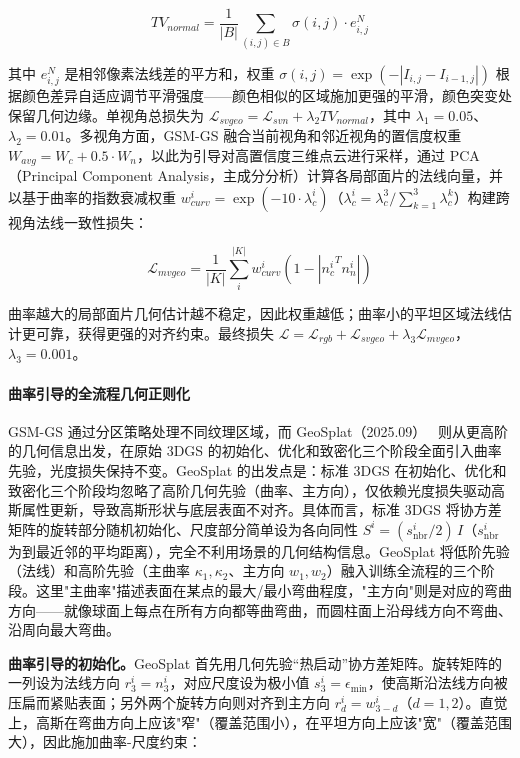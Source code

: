 \begin{equation}
TV_{normal} = \frac{1}{|B|} \sum_{(i,j) \in B} \sigma(i,j) \cdot e^N_{i,j}
\end{equation}

其中 $e^N_{i,j}$ 是相邻像素法线差的平方和，权重 $\sigma(i,j) = \exp(-|I_{i,j} - I_{i-1,j}|)$ 根据颜色差异自适应调节平滑强度——颜色相似的区域施加更强的平滑，颜色突变处保留几何边缘。单视角总损失为 $\mathcal{L}_{svgeo} = \mathcal{L}_{svn} + \lambda_2 TV_{normal}$，其中 $\lambda_1 = 0.05$、$\lambda_2 = 0.01$。多视角方面，GSM-GS 融合当前视角和邻近视角的置信度权重 $W_{avg} = W_c + 0.5 \cdot W_n$，以此为引导对高置信度三维点云进行采样，通过 PCA（Principal Component Analysis，主成分分析）计算各局部面片的法线向量，并以基于曲率的指数衰减权重 $w^i_{curv} = \exp(-10 \cdot \lambda^i_c)$（$\lambda^i_c = \lambda^3_c / \sum_{k=1}^3 \lambda^k_c$）构建跨视角法线一致性损失：

\begin{equation}
\mathcal{L}_{mvgeo} = \frac{1}{|K|} \sum_{i}^{|K|} w^i_{curv} (1 - |{n_c^{i}}^T n_n^i|)
\end{equation}

曲率越大的局部面片几何估计越不稳定，因此权重越低；曲率小的平坦区域法线估计更可靠，获得更强的对齐约束。最终损失 $\mathcal{L} = \mathcal{L}_{rgb} + \mathcal{L}_{svgeo} + \lambda_3 \mathcal{L}_{mvgeo}$，$\lambda_3 = 0.001$。

\paragraph{曲率引导的全流程几何正则化}

GSM-GS 通过分区策略处理不同纹理区域，而 GeoSplat（2025.09）~\cite{2509_05075} 则从更高阶的几何信息出发，在原始 3DGS 的初始化、优化和致密化三个阶段全面引入曲率先验，光度损失保持不变。GeoSplat 的出发点是：标准 3DGS 在初始化、优化和致密化三个阶段均忽略了高阶几何先验（曲率、主方向），仅依赖光度损失驱动高斯属性更新，导致高斯形状与底层表面不对齐。具体而言，标准 3DGS 将协方差矩阵的旋转部分随机初始化、尺度部分简单设为各向同性 $S^i = (s^i_{\text{nbr}} / 2)\,I$（$s^i_{\text{nbr}}$ 为到最近邻的平均距离），完全不利用场景的几何结构信息。GeoSplat 将低阶先验（法线）和高阶先验（主曲率 $\kappa_1, \kappa_2$、主方向 $w_1, w_2$）融入训练全流程的三个阶段。这里"主曲率"描述表面在某点的最大/最小弯曲程度，"主方向"则是对应的弯曲方向——就像球面上每点在所有方向都等曲弯曲，而圆柱面上沿母线方向不弯曲、沿周向最大弯曲。

\textbf{曲率引导的初始化。}GeoSplat 首先用几何先验“热启动”协方差矩阵。旋转矩阵的一列设为法线方向 $r_3^i = n^i_3$，对应尺度设为极小值 $s^i_3 = \epsilon_{\min}$，使高斯沿法线方向被压扁而紧贴表面；另外两个旋转方向则对齐到主方向 $r_d^i = w^i_{3-d}$（$d=1,2$）。直觉上，高斯在弯曲方向上应该"窄"（覆盖范围小），在平坦方向上应该"宽"（覆盖范围大），因此施加曲率-尺度约束：

